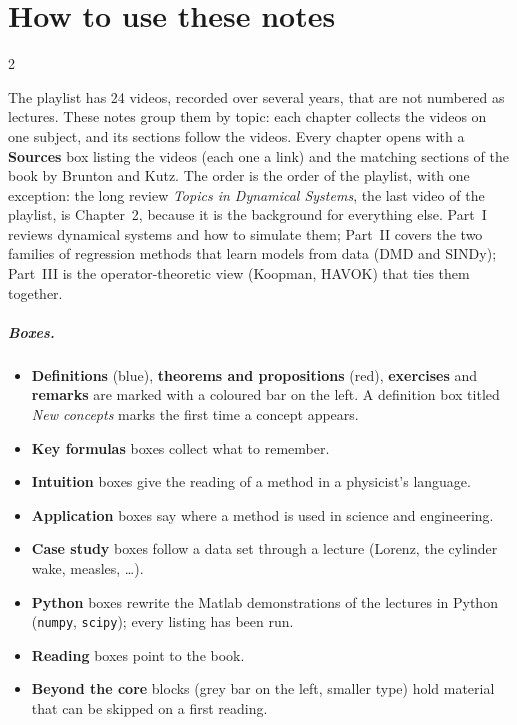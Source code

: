 \documentclass[12pt,oneside,openany]{book}
\begin{document}
\chapter*{How to use these notes}
\begin{paracol}{2}

The playlist has 24 videos, recorded over several years, that are not numbered as lectures. These
notes group them by topic: each chapter collects the videos on one subject, and its sections follow
the videos. Every chapter opens with a \textbf{Sources} box listing the videos (each one a link) and the
matching sections of the book by Brunton and Kutz. The order is the order of the playlist, with one
exception: the long review \emph{Topics in Dynamical Systems}, the last video of the playlist, is
Chapter~2, because it is the background for everything else.
Part~I reviews dynamical systems and how to simulate them; Part~II covers the two families of
regression methods that learn models from data (DMD and SINDy); Part~III is the operator-theoretic
view (Koopman, HAVOK) that ties them together.

\paragraph{Boxes.}
\begin{itemize}
  \item \textcolor{defcol}{\textbf{Definitions}} (blue), \textcolor{thmcol}{\textbf{theorems and propositions}} (red),
        \textcolor{exercol}{\textbf{exercises}} and \textcolor{srccol}{\textbf{remarks}} are marked with a
        coloured bar on the left. A definition box titled \emph{New concepts} marks the first time a concept appears.
  \item \textcolor{keycol}{\textbf{Key formulas}} boxes collect what to remember.
  \item \textcolor{intucol}{\textbf{Intuition}} boxes give the reading of a method in a physicist's language.
  \item \textcolor{fincol}{\textbf{Application}} boxes say where a method is used in science and engineering.
  \item \textcolor{cscol}{\textbf{Case study}} boxes follow a data set through a lecture (Lorenz, the
        cylinder wake, measles, \dots).
  \item \textcolor{srccol}{\textbf{Python}} boxes rewrite the Matlab demonstrations of the lectures in
        Python (\texttt{numpy}, \texttt{scipy}); every listing has been run.
  \item \textcolor{srccol}{\textbf{Reading}} boxes point to the book.
  \item \textbf{Beyond the core} blocks (grey bar on the left, smaller type) hold material that can be
        skipped on a first reading.
\end{itemize}


\end{paracol}
\end{document}
